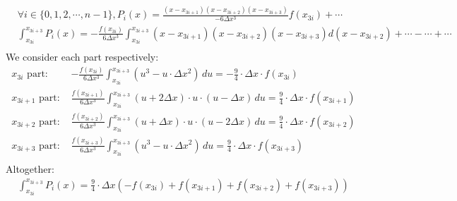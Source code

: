 \documentclass{article}
\begin{document}
$$\begin{aligned}
    &\forall i \in \{0,1,2,\cdots,n-1\}, P_i(x) = \frac{(x-x_{3i+1})(x-x_{3i+2})(x-x_{3i+3})}{-6\Delta x^3} f(x_{3i}) + \cdots \\
    &\int_{x_{3i}}^{x_{3i+3}} P_i(x) = -\frac{f(x_{3i})}{6\Delta x^3} \int_{x_{3i}}^{x_{3i+3}} (x-x_{3i+1})(x-x_{3i+2})(x-x_{3i+3}) d\left(x-x_{3i+2}\right) + \cdots - \cdots + \cdots \\
\end{aligned}$$
We consider each part respectively:
$$\begin{aligned} x_{3i} \text{ part: }& -\frac{f(x_{3i})}{6\Delta x^3} \int_{x_{3i}}^{x_{3i+3}} (u^3-u\cdot\Delta x^2) \,du = -\frac{9}{4} \cdot \Delta x \cdot f(x_{3i}) \\
x_{3i+1} \text{ part: }& \frac{f(x_{3i+1})}{6\Delta x^3} \int_{x_{3i}}^{x_{3i+3}} (u+2\Delta x)\cdot u\cdot (u-\Delta x) \,du = \frac{9}{4} \cdot \Delta x \cdot f(x_{3i+1}) \\
x_{3i+2} \text{ part: }& \frac{f(x_{3i+2})}{6\Delta x^3} \int_{x_{3i}}^{x_{3i+3}} (u+\Delta x)\cdot u\cdot (u-2\Delta x) \,du = \frac{9}{4} \cdot \Delta x \cdot f(x_{3i+2}) \\
x_{3i+3} \text{ part: }& \frac{f(x_{3i+3})}{6\Delta x^3} \int_{x_{3i}}^{x_{3i+3}} (u^3-u\cdot\Delta x^2) \,du = \frac{9}{4} \cdot \Delta x \cdot f(x_{3i+3}) \\
\end{aligned}$$
Altogether:
$$\begin{aligned}
    \int_{x_{3i}}^{x_{3i+3}} P_i(x) = \frac{9}{4} \cdot \Delta x \left( -f(x_{3i}) + f(x_{3i+1}) + f(x_{3i+2}) + f(x_{3i+3}) \right)
\end{aligned}$$
\end{document}
